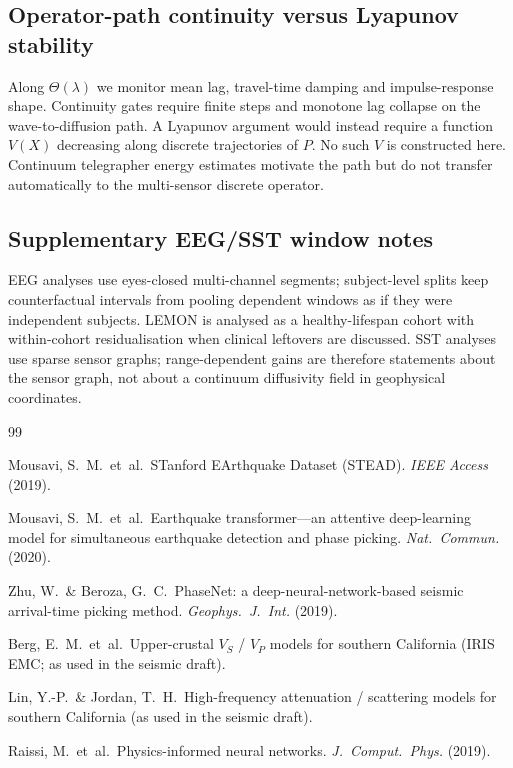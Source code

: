 \documentclass[twocolumn,10pt]{article}
\begin{document}
\subsection*{Operator-path continuity versus Lyapunov stability}
Along \(\Theta(\lambda)\) we monitor mean lag, travel-time damping and
impulse-response shape. Continuity gates require finite steps and monotone lag
collapse on the wave-to-diffusion path. A Lyapunov argument would instead
require a function \(V(X)\) decreasing along discrete trajectories of \(P\).
No such \(V\) is constructed here. Continuum telegrapher energy estimates
motivate the path but do not transfer automatically to the multi-sensor
discrete operator.

\subsection*{Supplementary EEG/SST window notes}
EEG analyses use eyes-closed multi-channel segments; subject-level splits keep
counterfactual intervals from pooling dependent windows as if they were
independent subjects. LEMON is analysed as a healthy-lifespan cohort with
within-cohort residualisation when clinical leftovers are discussed. SST
analyses use sparse sensor graphs; range-dependent gains are therefore
statements about the sensor graph, not about a continuum diffusivity field in
geophysical coordinates.


\begin{thebibliography}{99}

Mousavi, S.~M.\ et~al.\
STanford EArthquake Dataset (STEAD).
\emph{IEEE Access} (2019).

Mousavi, S.~M.\ et~al.\
Earthquake transformer---an attentive deep-learning model for simultaneous
earthquake detection and phase picking.
\emph{Nat.\ Commun.} (2020).

Zhu, W.\ \& Beroza, G.~C.\
PhaseNet: a deep-neural-network-based seismic arrival-time picking method.
\emph{Geophys.\ J.\ Int.} (2019).

\bibitem{berg2021}
Berg, E.~M.\ et~al.\
Upper-crustal \(V_S\) / \(V_P\) models for southern California
(IRIS EMC; as used in the seismic draft).

\bibitem{lin2023}
Lin, Y.-P.\ \& Jordan, T.~H.\
High-frequency attenuation / scattering models for southern California
(as used in the seismic draft).

Raissi, M.\ et~al.\
Physics-informed neural networks.
\emph{J.\ Comput.\ Phys.} (2019).

\end{thebibliography}
\end{document}
